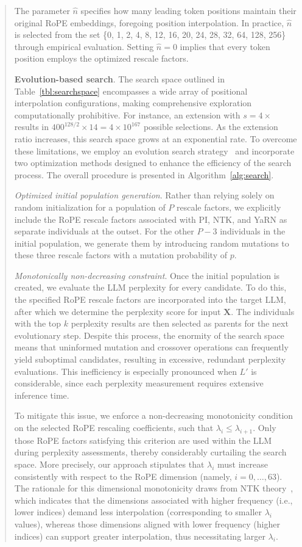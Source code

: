 \begin{abstract}
The parameter $\hat{n}$ specifies how many leading token positions maintain their original RoPE embeddings, foregoing position interpolation. In practice, $\hat{n}$ is selected from the set \{0, 1, 2, 4, 8, 12, 16, 20, 24, 28, 32, 64, 128, 256\} through empirical evaluation. Setting $\hat{n}=0$ implies that every token position employs the optimized rescale factors.

\textbf{Evolution-based search}. The search space outlined in Table~\ref{tbl:searchspace} encompasses a wide array of positional interpolation configurations, making comprehensive exploration computationally prohibitive. For instance, an extension with $s=4\times$ results in $400^{128/2}\times14=4\times10^{167}$ possible selections. As the extension ratio increases, this search space grows at an exponential rate. To overcome these limitations, we employ an evolution search strategy~\cite{guo2020single} and incorporate two optimization methods designed to enhance the efficiency of the search process. The overall procedure is presented in Algorithm~\ref{alg:search}.

\textit{Optimized initial population generation}. Rather than relying solely on random initialization for a population of $P$ rescale factors, we explicitly include the RoPE rescale factors associated with PI, NTK, and YaRN as separate individuals at the outset. For the other $P-3$ individuals in the initial population, we generate them by introducing random mutations to these three rescale factors with a mutation probability of $p$.

\textit{Monotonically non-decreasing constraint}. Once the initial population is created, we evaluate the LLM perplexity for every candidate. To do this, the specified RoPE rescale factors are incorporated into the target LLM, after which we determine the perplexity score for input $\mathbf{X}$. The individuals with the top $k$ perplexity results are then selected as parents for the next evolutionary step. Despite this process, the enormity of the search space means that uninformed mutation and crossover operations can frequently yield suboptimal candidates, resulting in excessive, redundant perplexity evaluations. This inefficiency is especially pronounced when $L'$ is considerable, since each perplexity measurement requires extensive inference time.

To mitigate this issue, we enforce a non-decreasing monotonicity condition on the selected RoPE rescaling coefficients, such that $\lambda_i \leq \lambda_{i+1}$. Only those RoPE factors satisfying this criterion are used within the LLM during perplexity assessments, thereby considerably curtailing the search space. More precisely, our approach stipulates that $\lambda_i$ must increase consistently with respect to the RoPE dimension (namely, $i=0,\ldots,63$). The rationale for this dimensional monotonicity draws from NTK theory~\cite{jacot2018neural,tancik2020fourier,ntk}, which indicates that the dimensions associated with higher frequency (i.e., lower indices) demand less interpolation (corresponding to smaller $\lambda_i$ values), whereas those dimensions aligned with lower frequency (higher indices) can support greater interpolation, thus necessitating larger $\lambda_i$.


\end{abstract}
